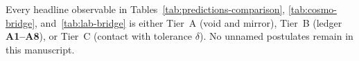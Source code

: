 \begin{corollary}\label{cor:semantic-closure}
Every headline observable in Tables~\ref{tab:predictions-comparison},
\ref{tab:cosmo-bridge}, and~\ref{tab:lab-bridge} is either Tier~A (void and
mirror), Tier~B (ledger \textbf{A1--A8}), or Tier~C (contact with tolerance
$\delta$). No unnamed postulates remain in this manuscript.
\end{corollary}